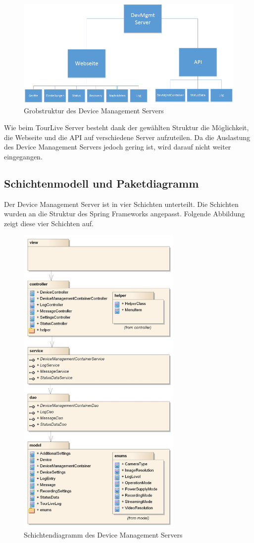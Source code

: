 \begin{figure}[H]
	\centering
	\includegraphics[width=120mm]{images/devmgmtsrv/uebersicht.png}
	\caption{Grobstruktur des Device Management Servers}
\end{figure}

Wie beim TourLive Server besteht dank der gewählten Struktur die Möglichkeit, die Webseite und die API auf verschiedene Server aufzuteilen. Da die Auslastung des Device Management Servers jedoch gering ist, wird darauf nicht weiter eingegangen.

\subsection{Schichtenmodell und Paketdiagramm}
Der Device Management Server ist in vier Schichten unterteilt. Die Schichten wurden an die Struktur des Spring Frameworks angepasst. Folgende Abbildung zeigt diese vier Schichten auf.

\begin{figure}[H]
	\centering
	\includegraphics[width=80mm]{images/devmgmtsrv/schichten.jpg}
	\caption{Schichtendiagramm des Device Management Servers}
\end{figure}

